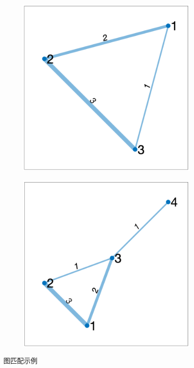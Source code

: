 \begin{figure}[htb!]
    \centering
    \begin{subfigure}{.3\textwidth}
        \centering
        \includegraphics[width=.9\textwidth]{./img/tracking/graph3.pdf}
        \caption{}
        \label{fig_gm_eg_1}
    \end{subfigure}
    \begin{subfigure}{.3\textwidth}
        \centering
        \includegraphics[width=.9\textwidth]{./img/tracking/graph4.pdf}
        \caption{}
        \label{fig_gm_eg_2}
    \end{subfigure}
    \caption{图匹配示例}
    \label{fig_gm_eg}
\end{figure}

